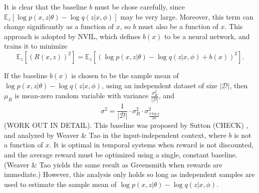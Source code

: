 \documentclass{article} %
\begin{document}
It is clear that the baseline $b$ must be chose carefully, since $\mathbb{E}_z \left[ \log p(x,z | \theta) - \log q(z | x, \phi) \right]$ may be very large.  Moreover, this term can change significantly as a function of $x$, so $b$ must also be a function of $x$.  This approach is adopted by NVIL, which defines $b(x)$ to be a neural network, and trains it to minimize 
\begin{equation*}
\mathbb{E}_z \left[ \left(R(x,z) \right)^2 \right] = \mathbb{E}_z \left[ \left( \log p(x,z | \theta) - \log q(z | x, \phi) + b(x) \right)^2 \right].
\end{equation*}

If the baseline $b(x)$ is chosen to be the sample mean of $\log p(x,z|\theta) - \log q(z | x, \phi)$, using an independent dataset of size $|\mathcal{D}|$, then $\mu_R$ is mean-zero random variable with variance $\frac{\sigma_R^2}{|\mathcal{D}|}$, and 
\begin{equation*}
\sigma^2 = \frac{1}{|\mathcal{D} |} \cdot \sigma_R^2 \cdot \sigma_{\frac{\partial \log q}{\partial \phi}}^2
\end{equation*}
(WORK OUT IN DETAIL).  This baseline was proposed by Sutton (CHECK) \cite{sutton1984temporal}, and analyzed by Weaver \& Tao \cite{weaver2001optimal} in the input-independent context, where $b$ is not a function of $x$.  It is optimal in temporal systems when reward is not discounted, and the average reward must be optimized using a single, constant baseline.  (Weaver \& Tao yields the same result as Greensmith when rewards are immediate.)  However, this analysis only holds so long as independent samples are used to estimate the sample mean of $\log p(x,z|\theta) - \log q(z | x, \phi)$.
\end{document}
